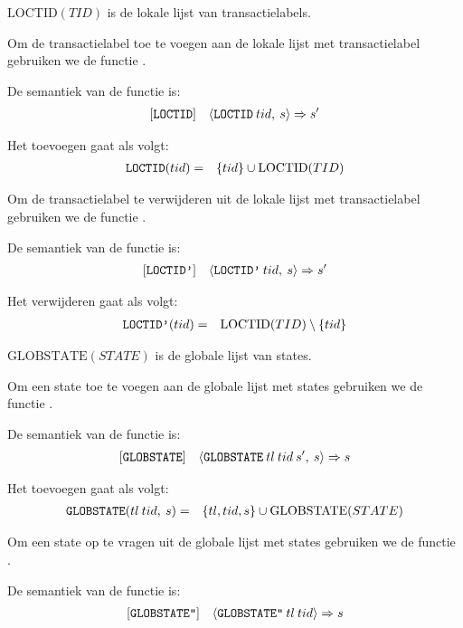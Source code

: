 \(\mathrm{LOCTID}(TID)\) is de lokale lijst van transactielabels.

Om de transactielabel toe te voegen aan de lokale lijst met transactielabel gebruiken we de functie .

De semantiek van de functie is:
\begin{eqnarray*}
\left[\textnormal{\texttt{LOCTID}}\right]&&
\langle\textnormal{\texttt{LOCTID}}\:tid,\:s\rangle => s'
\end{eqnarray*}

Het toevoegen gaat als volgt:
\begin{eqnarray*}
	\textnormal{\texttt{LOCTID}}(tid) &=& \{tid\}\cup\mathrm{LOCTID}(TID) \\
\end{eqnarray*}

Om de transactielabel te verwijderen uit de lokale lijst met transactielabel gebruiken we de functie
.

De semantiek van de functie is:
\begin{eqnarray*}
\left[\textnormal{\texttt{LOCTID'}}\right]&&
\langle\textnormal{\texttt{LOCTID'}}\:tid,\:s\rangle => s'
\end{eqnarray*}

Het verwijderen gaat als volgt:
\begin{eqnarray*}
	\textnormal{\texttt{LOCTID'}}(tid) &=& \mathrm{LOCTID}(TID) \setminus \{tid\} \\
\end{eqnarray*}



\(\mathrm{GLOBSTATE}(STATE)\) is de globale lijst van states.

Om een state toe te voegen aan de globale lijst met states gebruiken we de functie .

De semantiek van de
functie is:
\begin{eqnarray*}
\left[\textnormal{\texttt{GLOBSTATE}}\right]&&
\langle\textnormal{\texttt{GLOBSTATE}}\:tl\:tid\:s',\:s\rangle => s
\end{eqnarray*}

Het toevoegen gaat als volgt:
\begin{eqnarray*}
	\textnormal{\texttt{GLOBSTATE}}(tl\:tid,\:s) &=& \{tl,tid,s\}\cup\mathrm{GLOBSTATE}(STATE) \\
\end{eqnarray*}

Om een state op te vragen uit de globale lijst met states gebruiken we de functie
.

De semantiek van de functie is:
\begin{eqnarray*}
\left[\textnormal{\texttt{GLOBSTATE''}}\right]&&
\langle\textnormal{\texttt{GLOBSTATE''}}\:tl\:tid\rangle => s
\end{eqnarray*}

